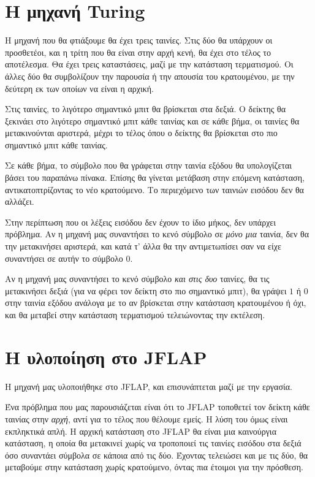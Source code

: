 \documentclass{article}
\begin{document}
\section{Η μηχανή Turing}

Η μηχανή που θα φτιάξουμε θα έχει τρεις ταινίες. Στις δύο θα υπάρχουν οι προσθετέοι, και η τρίτη που θα είναι στην αρχή κενή, θα έχει στο τέλος το αποτέλεσμα. Θα έχει τρεις καταστάσεις, μαζί με την κατάσταση τερματισμού. Οι άλλες δύο θα συμβολίζουν την παρουσία ή την απουσία του κρατουμένου, με την δεύτερη εκ των οποίων να είναι η αρχική.

Στις ταινίες, το λιγότερο σημαντικό μπιτ θα βρίσκεται στα δεξιά. Ο δείκτης θα ξεκινάει στο λιγότερο σημαντικό μπιτ κάθε ταινίας και σε κάθε βήμα, οι ταινίες θα μετακινούνται αριστερά, μέχρι το τέλος όπου ο δείκτης θα βρίσκεται στο πιο σημαντικό μπιτ κάθε ταινίας.

Σε κάθε βήμα, το σύμβολο που θα γράφεται στην ταινία εξόδου θα υπολογίζεται βάσει του παραπάνω πίνακα. Επίσης θα γίνεται μετάβαση στην επόμενη κατάσταση, αντικατοπτρίζοντας το νέο κρατούμενο. Το περιεχόμενο των ταινιών εισόδου δεν θα αλλάζει.

Στην περίπτωση που οι λέξεις εισόδου δεν έχουν το ίδιο μήκος, δεν υπάρχει πρόβλημα. Αν η μηχανή μας συναντήσει το κενό σύμβολο σε \emph{μόνο μια} ταινία, δεν θα την μετακινήσει αριστερά, και κατά τ' άλλα θα την αντιμετωπίσει σαν να είχε συναντήσει σε αυτήν το σύμβολο $0$.

Αν η μηχανή μας συναντήσει το κενό σύμβολο \emph{και στις δυο} ταινίες, θα τις μετακινήσει δεξιά (για να φέρει τον δείκτη στο πιο σημαντικό μπιτ), θα γράψει $1$ ή $0$ στην ταινία εξόδου ανάλογα με το αν βρίσκεται στην κατάσταση κρατουμένου ή όχι, και θα μεταβεί στην κατάσταση τερματισμού τελειώνοντας την εκτέλεση.

\section{Η υλοποίηση στο JFLAP}

Η μηχανή μας υλοποιήθηκε στο JFLAP, και επισυνάπτεται μαζί με την εργασία.

Ένα πρόβλημα που μας παρουσιάζεται είναι ότι το JFLAP τοποθετεί τον δείκτη κάθε ταινίας στην \emph{αρχή}, αντί για το τέλος που θέλουμε εμείς. Η λύση του όμως είναι εκπληκτικά απλή. Η αρχική κατάσταση στο JFLAP θα είναι μια καινούργια κατάσταση, η οποία θα μετακινεί χωρίς να τροποποιεί τις ταινίες εισόδου στα δεξιά όσο συναντάει σύμβολα σε κάποια από τις δύο. Έχοντας τελειώσει και με τις δύο, θα μεταβούμε στην κατάσταση χωρίς κρατούμενο, όντας πια έτοιμοι για την πρόσθεση.
\end{document}
